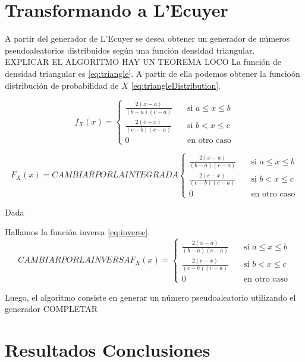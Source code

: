 \documentclass{sig-alternate}
\begin{document}
\section{Transformando a L'Ecuyer}
\label{sec:triangle}

A partir del generador de L'Ecuyer se desea obtener un generador de n\'umeros
pseudoaleatorios distribuidos seg\'un una funci\'on densidad triangular.\\
EXPLICAR EL ALGORITMO HAY UN TEOREMA LOCO
La funci\'on de densidad triangular es \eqref{eq:triangle}. A partir de ella
podemos obtener la funcio\'on distribuci\'on de probabilidad de $X$
\eqref{eq:triangleDistribution}.

\begin{equation}
\label{eq:triangle}
f_{X}(x) =
\begin{cases}
\frac{2(x-a)}{(b-a)(c-a)} \quad & \text{si } a\leq x \leq b \\
\frac{2(c-x)}{(c-b)(c-a)} \quad & \text{si } b < x \leq c \\
0 \quad & \text{en otro caso}
\end{cases}
\end{equation}

\begin{equation}
\label{eq:triangleDistribution}
F_{X}(x) =
CAMBIAR POR LA INTEGRADA
\begin{cases}
\frac{2(x-a)}{(b-a)(c-a)} \quad & \text{si } a\leq x \leq b \\
\frac{2(c-x)}{(c-b)(c-a)} \quad & \text{si } b < x \leq c \\
0 \quad & \text{en otro caso}
\end{cases}
\end{equation}

Dada 

Hallamos la funci\'on inversa \eqref{eq:inverse}.\\

\begin{equation}
\label{eq:triangle}

CAMBIAR POR LA INVERSA
F_{X}(x) =
\begin{cases}
\frac{2(x-a)}{(b-a)(c-a)} \quad & \text{si } a\leq x \leq b \\
\frac{2(c-x)}{(c-b)(c-a)} \quad & \text{si } b < x \leq c \\
0 \quad & \text{en otro caso}
\end{cases}
\end{equation}


Luego, el algoritmo consiste en generar un n\'umero pseudoaleatorio utilizando
el generador COMPLETAR


\newpage

\section{Resultados Conclusiones}
\label{sec:conclusiones}

\end{document}
